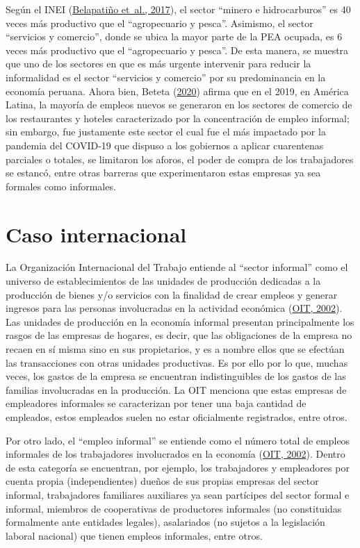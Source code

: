 \documentclass[
  letterpaper,
  12pt,
  oneside,
  spanish,
  doublespacing,
  headsepline,
  parskip]{MastersDoctoralThesis}
\begin{document}
Según el INEI (\protect\hyperlink{ref-belapatiuxf1o2017}{Belapatiño
et~al., 2017}), el sector ``minero e hidrocarburos'' es 40 veces más
productivo que el ``agropecuario y pesca''. Asimismo, el sector
``servicios y comercio'', donde se ubica la mayor parte de la PEA
ocupada, es 6 veces más productivo que el ``agropecuario y pesca''. De
esta manera, se muestra que uno de los sectores en que es más urgente
intervenir para reducir la informalidad es el sector ``servicios y
comercio'' por su predominancia en la economía peruana. Ahora bien,
Beteta (\protect\hyperlink{ref-beteta2020}{2020}) afirma que en el 2019,
en América Latina, la mayoría de empleos nuevos se generaron en los
sectores de comercio de los restaurantes y hoteles caracterizado por la
concentración de empleo informal; sin embargo, fue justamente este
sector el cual fue el más impactado por la pandemia del COVID-19 que
dispuso a los gobiernos a aplicar cuarentenas parciales o totales, se
limitaron los aforos, el poder de compra de los trabajadores se estancó,
entre otras barreras que experimentaron estas empresas ya sea formales
como informales.

\hypertarget{caso-internacional}{%
\section{Caso internacional}\label{caso-internacional}}

La Organización Internacional del Trabajo entiende al ``sector
informal'' como el universo de establecimientos de las unidades de
producción dedicadas a la producción de bienes y/o servicios con la
finalidad de crear empleos y generar ingresos para las personas
involucradas en la actividad económica
(\protect\hyperlink{ref-oit2002}{OIT, 2002}). Las unidades de producción
en la economía informal presentan principalmente los rasgos de las
empresas de hogares, es decir, que las obligaciones de la empresa no
recaen en sí misma sino en sus propietarios, y es a nombre ellos que se
efectúan las transacciones con otras unidades productivas. Es por ello
por lo que, muchas veces, los gastos de la empresa se encuentran
indistinguibles de los gastos de las familias involucradas en la
producción. La OIT menciona que estas empresas de empleadores informales
se caracterizan por tener una baja cantidad de empleados, estos
empleados suelen no estar oficialmente registrados, entre otros.

Por otro lado, el ``empleo informal'' se entiende como el número total
de empleos informales de los trabajadores involucrados en la economía
(\protect\hyperlink{ref-oit2002}{OIT, 2002}). Dentro de esta categoría
se encuentran, por ejemplo, los trabajadores y empleadores por cuenta
propia (independientes) dueños de sus propias empresas del sector
informal, trabajadores familiares auxiliares ya sean partícipes del
sector formal e informal, miembros de cooperativas de productores
informales (no constituidas formalmente ante entidades legales),
asalariados (no sujetos a la legislación laboral nacional) que tienen
empleos informales, entre otros.
\end{document}
